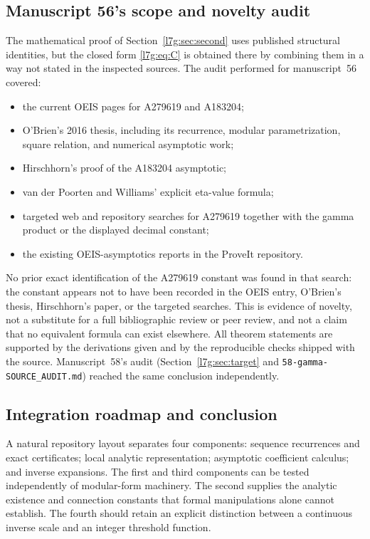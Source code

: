 \documentclass[11pt,letterpaper]{article}
\newcommand{\file}[1]{\nolinkurl{#1}}
\theoremstyle{remark}\newtheorem{remark}[theorem]{Remark}
\newcounter{l7gtrsavedeq}
\begin{document}
\subsection{Manuscript 56's scope and novelty audit}\label{l7g:sec:audit}
The mathematical proof of Section~\ref{l7g:sec:second} uses published
structural identities, but the closed form \eqref{l7g:eq:C} is obtained
there by combining them in a way not stated in the inspected sources.
The audit performed for manuscript~56 covered:
\begin{itemize}[leftmargin=2em]
\item the current OEIS pages for A279619 and A183204;
\item O'Brien's 2016 thesis, including its recurrence, modular
      parametrization, square relation, and numerical asymptotic work;
\item Hirschhorn's proof of the A183204 asymptotic;
\item van der Poorten and Williams' explicit eta-value formula;
\item targeted web and repository searches for A279619 together with
      the gamma product or the displayed decimal constant;
\item the existing OEIS-asymptotics reports in the ProveIt repository.
\end{itemize}
No prior exact identification of the A279619 constant was found in that
search: the constant appears not to have been recorded in the OEIS entry,
O'Brien's thesis, Hirschhorn's paper, or the targeted searches. This is
evidence of novelty, not a substitute for a full bibliographic review or
peer review, and not a claim that no equivalent formula can exist
elsewhere. All theorem statements are supported by the derivations given
and by the reproducible checks shipped with the source. Manuscript~58's
audit (Section~\ref{l7g:sec:target} and
\file{58-gamma-SOURCE_AUDIT.md}) reached the same conclusion
independently.

\subsection{Integration roadmap and conclusion}

A natural repository layout separates four components: sequence
recurrences and exact certificates; local analytic representation;
asymptotic coefficient calculus; and inverse expansions. The first and
third components can be tested independently of modular-form machinery.
The second supplies the analytic existence and connection constants
that formal manipulations alone cannot establish. The fourth should
retain an explicit distinction between a continuous inverse scale and
an integer threshold function.
\end{document}
